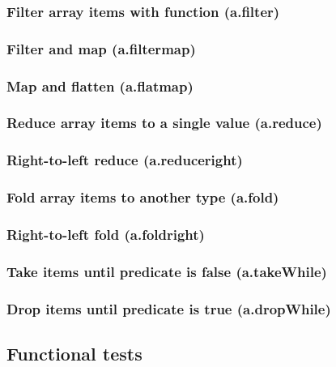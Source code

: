 \documentclass{article}
\theoremstyle{definition}
\begin{document}
\subsubsection{Filter array items with function (a.filter)}

\subsubsection{Filter and map (a.filtermap)}

\subsubsection{Map and flatten (a.flatmap)}

\subsubsection{Reduce array items to a single value (a.reduce)}

\subsubsection{Right-to-left reduce (a.reduceright)}

\subsubsection{Fold array items to another type (a.fold)}

\subsubsection{Right-to-left fold (a.foldright)}

\subsubsection{Take items until predicate is false (a.takeWhile)}

\subsubsection{Drop items until predicate is true (a.dropWhile)}

\subsection{Functional tests}
\end{document}
